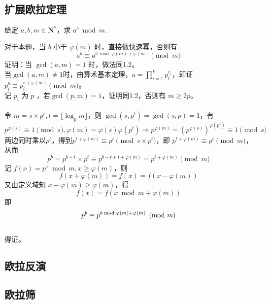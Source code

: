 \documentclass[12pt,a4paper]{article}
\begin{document}
\subsection{扩展欧拉定理}
\begin{mdframed}[leftline=true, linewidth=2pt, linecolor=gray]
	给定 $a,b,m\in \mathbf{N^*}$，求 $a^b\bmod{m}$.
\end{mdframed}
对于本题，当 $b$ 小于 $\varphi(m)$ 时，直接做快速幂，否则有
\begin{equation*}
	\displaystyle a^b\equiv a^{b\bmod{\varphi(m)}+\varphi(m)}\pmod{m}
\end{equation*}
证明：当 $\gcd(a,m)=1$ 时，做法同1.2。\\
当$\gcd(a,m)\neq1$时，由算术基本定理，$\displaystyle a=\prod_{i=1}^{k}p_i^{e_i}$，即证 $p_i^b\equiv p_i^{r+\varphi(m)}\pmod{m}$。\\记 $p_i$ 为 $p$ ，若$\gcd(p,m)=1$，证明同1.2，否则有 $m\ge 2p$。\\\\
令 $m=s\times p^t,t=\lfloor\log_p{m}\rfloor$，则 $\gcd(s,p^t)=\gcd(s,p)=1$，有
\begin{equation*}
	p^{\varphi(s)}\equiv1\pmod{s},\varphi(m)=\varphi(s)\varphi(p^t)\Rightarrow p^{\varphi(m)}=(p^{\varphi(s)})^{\varphi(p^t)}\equiv1\pmod{s}
\end{equation*}
两边同时乘以$p^t$，得到$p^{t+\varphi(m)}\equiv p^t\pmod{s\times p^t}$，即 $p^{t+\varphi(m)}\equiv p^t\pmod{m}$，从而
\begin{equation*}
	\displaystyle p^b=p^{b-t}\times p^t\equiv p^{b-t+t+\varphi(m)}=p^{b+\varphi(m)}\pmod{m}
\end{equation*}
记 $f(x)=p^{x}\bmod{m},x\ge\varphi(m)$，则 \begin{equation*}
	f(x+\varphi(m))=f(x)=f(x-\varphi(m))
\end{equation*}
又由定义域知 $x-\varphi(m)\ge\varphi(m)$，得 
\begin{equation*}
	f(x)=f(x\bmod{m}+\varphi(m))
\end{equation*}
即
\begin{equation*}
	p^b\equiv p^{b\bmod{\varphi(m)}+\varphi(m)}\pmod{m}\\
\end{equation*} 
\\得证。
\subsection{欧拉反演}
\subsection{欧拉筛}
\end{document}

